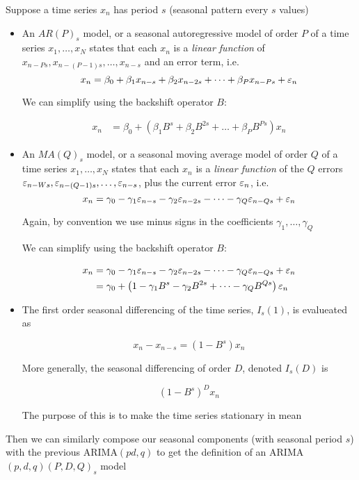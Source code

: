 Suppose a time series $x_n$ has period $s$ (seasonal pattern every $s$ values)
\begin{itemize}

\item An $AR(P)_s$ model, or a seasonal autoregressive model of order $P$ of a time series $x_1,\dots,x_N$ states that each $x_n$ is a \textit{linear function} of $x_{n-Ps},x_{n-(P-1)s},\dots,x_{n-s}$ and an error term, i.e. 
$$x_n= \beta_0+\beta_1 x_{n-s}+\beta_2 x_{n-2s} +\dots + \beta_P x_{n-Ps}+\varepsilon_n$$

We can simplify using the backshift operator $B$:

\begin{align}
x_n &= \beta_0+\left(\beta_1 B^s+\beta_2 B^{2s} +\dots + \beta_P B^{Ps}\right)x_n
\end{align}

\item An $MA(Q)_s$ model, or a seasonal moving average model of order $Q$ of a time series $x_1,\dots,x_N$ states that each $x_n$ is a \textit{linear function} of the $Q$ errors $\varepsilon_{n-Ws},\varepsilon_{n-(Q-1)s},\dots,\varepsilon_{n-s}$, plus the current error $\varepsilon_n$, i.e. 
$$x_n= \gamma_0-\gamma_1 \varepsilon_{n-s}-\gamma_2 \varepsilon_{n-2s} -\dots - \gamma_Q \varepsilon_{n-Qs}+\varepsilon_n$$

Again, by convention we use minus signs in the coefficients $\gamma_1,\dots,\gamma_Q$

We can simplify using the backshift operator $B$:

\begin{align}
x_n
&= \gamma_0-\gamma_1 \varepsilon_{n-s}-\gamma_2 \varepsilon_{n-2s} -\dots - \gamma_Q \varepsilon_{n-Qs}+\varepsilon_n \nonumber \\
&= \gamma_0+\left(1-\gamma_1 B^s-\gamma_2 B^{2s} +\dots - \gamma_Q B^{Qs}\right)\varepsilon_n 
\end{align}

\item The first order seasonal differencing of the time series, $I_s(1)$, is evalueated as 

$$x_n-x_{n-s}=\left(1-B^s\right)x_n$$

More generally, the seasonal differencing of order $D$, denoted $I_s(D)$ is 

$$(1-B^s)^D x_n$$

The purpose of this is to make the time series  stationary in mean
\end{itemize}


Then we can similarly compose our seasonal components (with seasonal period $s$) with the previous ARIMA$(pd,q)$ to get the definition of an ARIMA$(p,d,q)(P,D,Q)_s$ model

